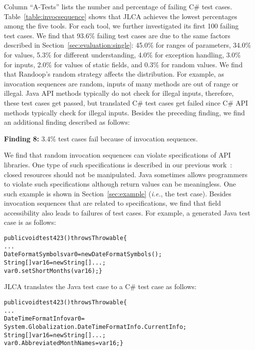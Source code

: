 Column ``A-Tests'' lists the number and percentage of failing C\# test cases. Table~\ref{table:invocsequence} shows that JLCA achieves the lowest percentages among the five tools. For each tool, we further investigated its first 100 failing test cases. We find that 93.6\% failing test cases are due to the same factors described in Section~\ref{sec:evaluation:single}: 45.0\% for ranges of parameters, 34.0\% for  values, 5.3\% for different understanding, 4.0\% for exception handling, 3.0\% for  inputs, 2.0\% for values of static fields, and 0.3\% for random values. We find that Randoop's random strategy affects the distribution. For example, as invocation sequences are random, inputs of many methods are out of range or illegal. Java API methods typically do not check for illegal inputs, therefore, these test cases get passed, but translated C\# test cases get failed since C\# API methods typically check for illegal inputs. Besides the preceding finding, we find an additional finding described as follows:

\textbf{Finding 8:} 3.4\% test cases fail because of invocation sequences.


We find that random invocation sequences can violate specifications of API libraries. One type of such specifications is described in our previous work~\cite{zhong09:inferring}: closed resources should not be manipulated. Java sometimes allows programmers to violate such specifications although return values can be meaningless. One such example is shown in Section~\ref{sec:example} (\emph{i.e.}, the  test case). Besides invocation sequences that are related to specifications, we find that field accessibility also leads to failures of test cases. For example, a generated Java test case is as follows:

\begin{CodeOut}\vspace*{-1ex}
\begin{alltt}
public void test423() throws Throwable\{
  ...
  DateFormatSymbols var0=new DateFormatSymbols();
  String[] var16=new String[]{...};
  var0.setShortMonths(var16);\}
\end{alltt}
\end{CodeOut}\vspace*{-2ex}

JLCA translates the Java test case to a C\# test case as follows:

\begin{CodeOut}\vspace*{-1ex}
\begin{alltt}
public void test423() throws Throwable\{
  ...
  DateTimeFormatInfo var0 =
  System.Globalization.DateTimeFormatInfo.CurrentInfo;
  String[] var16=new String[]{...};
  var0.AbbreviatedMonthNames = var16;\}
\end{alltt}
\end{CodeOut}\vspace*{-2ex}

